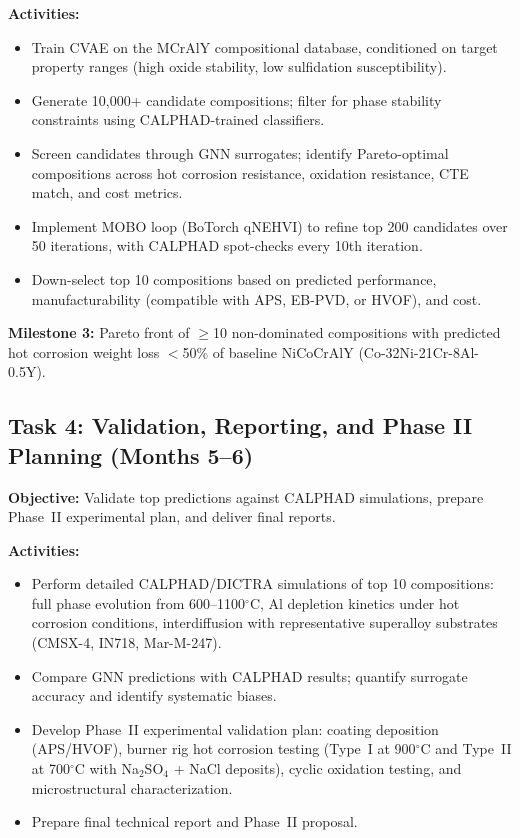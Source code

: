 \documentclass[11pt,letterpaper]{article}
\begin{document}
\textbf{Activities:}
\begin{itemize}[nosep]
  \item Train CVAE on the MCrAlY compositional database, conditioned on target property ranges (high oxide stability, low sulfidation susceptibility).
  \item Generate 10,000+ candidate compositions; filter for phase stability constraints using CALPHAD-trained classifiers.
  \item Screen candidates through GNN surrogates; identify Pareto-optimal compositions across hot corrosion resistance, oxidation resistance, CTE match, and cost metrics.
  \item Implement MOBO loop (BoTorch qNEHVI) to refine top 200 candidates over 50 iterations, with CALPHAD spot-checks every 10th iteration.
  \item Down-select top 10 compositions based on predicted performance, manufacturability (compatible with APS, EB-PVD, or HVOF), and cost.
\end{itemize}

\textbf{Milestone 3:} Pareto front of $\geq$10 non-dominated compositions with predicted hot corrosion weight loss $<$50\% of baseline NiCoCrAlY (Co-32Ni-21Cr-8Al-0.5Y).

\subsection{Task 4: Validation, Reporting, and Phase II Planning (Months 5--6)}

\textbf{Objective:} Validate top predictions against CALPHAD simulations, prepare Phase~II experimental plan, and deliver final reports.

\textbf{Activities:}
\begin{itemize}[nosep]
  \item Perform detailed CALPHAD/DICTRA simulations of top 10 compositions: full phase evolution from 600--1100$^\circ$C, Al depletion kinetics under hot corrosion conditions, interdiffusion with representative superalloy substrates (CMSX-4, IN718, Mar-M-247).
  \item Compare GNN predictions with CALPHAD results; quantify surrogate accuracy and identify systematic biases.
  \item Develop Phase~II experimental validation plan: coating deposition (APS/HVOF), burner rig hot corrosion testing (Type~I at 900$^\circ$C and Type~II at 700$^\circ$C with Na$_2$SO$_4$ + NaCl deposits), cyclic oxidation testing, and microstructural characterization.
  \item Prepare final technical report and Phase~II proposal.
\end{itemize}
\end{document}
